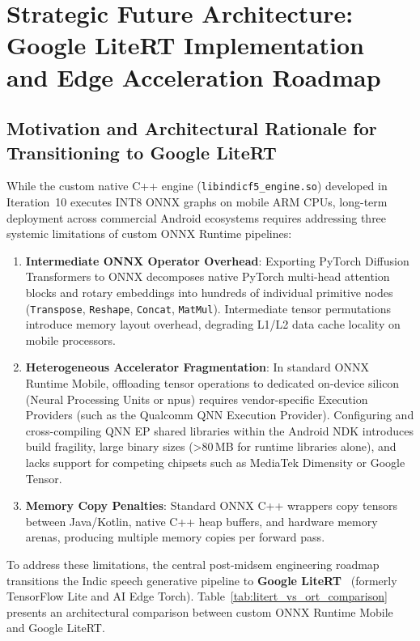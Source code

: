 \chapter{Strategic Future Architecture: Google LiteRT Implementation and Edge Acceleration Roadmap}
\label{Chapter5}

\section{Motivation and Architectural Rationale for Transitioning to Google LiteRT}
While the custom native C++ engine (\texttt{libindicf5\_engine.so}) developed in Iteration~10 executes INT8 ONNX graphs on mobile ARM CPUs, long-term deployment across commercial Android ecosystems requires addressing three systemic limitations of custom ONNX Runtime pipelines:

\begin{enumerate}
    \item \textbf{Intermediate ONNX Operator Overhead}: Exporting PyTorch Diffusion Transformers to ONNX decomposes native PyTorch multi-head attention blocks and rotary embeddings into hundreds of individual primitive nodes (\texttt{Transpose}, \texttt{Reshape}, \texttt{Concat}, \texttt{MatMul}). Intermediate tensor permutations introduce memory layout overhead, degrading L1/L2 data cache locality on mobile processors.
    
    \item \textbf{Heterogeneous Accelerator Fragmentation}: In standard ONNX Runtime Mobile, offloading tensor operations to dedicated on-device silicon (Neural Processing Units or \glspl{npu}) requires vendor-specific Execution Providers (such as the Qualcomm QNN Execution Provider). Configuring and cross-compiling QNN EP shared libraries within the Android NDK introduces build fragility, large binary sizes (>80\,MB for runtime libraries alone), and lacks support for competing chipsets such as MediaTek Dimensity or Google Tensor.
    
    \item \textbf{Memory Copy Penalties}: Standard ONNX C++ wrappers copy tensors between Java/Kotlin, native C++ heap buffers, and hardware memory arenas, producing multiple memory copies per forward pass.
\end{enumerate}

To address these limitations, the central post-midsem engineering roadmap transitions the Indic speech generative pipeline to \textbf{Google LiteRT}~\cite{google_litert2024} (formerly TensorFlow Lite and AI Edge Torch). Table~\ref{tab:litert_vs_ort_comparison} presents an architectural comparison between custom ONNX Runtime Mobile and Google LiteRT.

